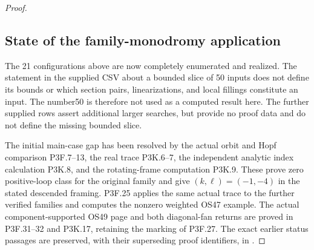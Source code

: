 \begin{proof}
\subsection{State of the family-monodromy application}\label{state-of-the-family-monodromy-application}

The 21 configurations above are now completely enumerated and realized. The statement in the supplied CSV about a bounded slice of 50 inputs does not define its bounds or which section pairs, linearizations, and local fillings constitute an input. The number50 is therefore not used as a computed result here. The further supplied rows assert additional larger searches, but provide no proof data and do not define the missing bounded slice.

The initial main-case gap has been resolved by the actual orbit and Hopf comparison P3F.7--13, the real trace P3K.6--7, the independent analytic index calculation P3K.8, and the rotating-frame computation P3K.9. These prove zero positive-loop class for the original family and give \((k,\ell)=(-1,-4)\) in the stated descended framing. P3F.25 applies the same actual trace to the further verified families and computes the nonzero weighted OS47 example. The actual component-supported OS49 page and both diagonal-fan returns are proved in P3F.31--32 and P3K.17, retaining the marking of P3F.27. The exact earlier status passages are preserved, with their superseding proof identifiers, in .
\end{proof}
